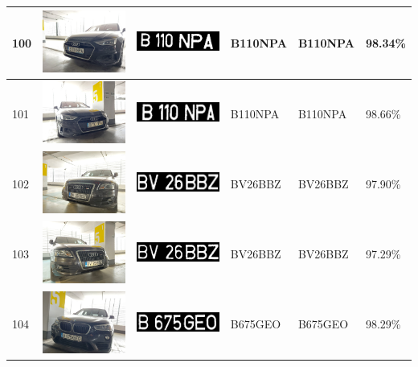 \documentclass[a4paper,12pt]{report}
\begin{document}
\begin{longtable}{| m{0.6cm} | m{3cm} | m{3cm} | m{1.8cm} | m{1.8cm} | m{1.8cm} |}
        100 & \includegraphics[width=3cm,keepaspectratio]{dataset/59_d1.jpg} & \includegraphics[width=3cm,keepaspectratio]{segmentari/100.jpg} & B110NPA & B110NPA & 98.34\% \\ \hline
        101 & \includegraphics[width=3cm,keepaspectratio]{dataset/59_s1.jpg} & \includegraphics[width=3cm,keepaspectratio]{segmentari/101.jpg} & B110NPA & B110NPA & 98.66\% \\ \hline
        102 & \includegraphics[width=3cm,keepaspectratio]{dataset/60_d1.jpg} & \includegraphics[width=3cm,keepaspectratio]{segmentari/102.jpg} & BV26BBZ & BV26BBZ & 97.90\% \\ \hline
        103 & \includegraphics[width=3cm,keepaspectratio]{dataset/60_s1.jpg} & \includegraphics[width=3cm,keepaspectratio]{segmentari/103.jpg} & BV26BBZ & BV26BBZ & 97.29\% \\ \hline
        104 & \includegraphics[width=3cm,keepaspectratio]{dataset/61_d1.jpg} & \includegraphics[width=3cm,keepaspectratio]{segmentari/104.jpg} & B675GEO & B675GEO & 98.29\% \\ \hline

\end{longtable}
\end{document}
